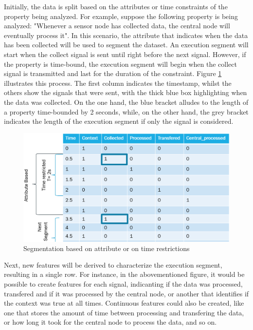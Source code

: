 Initially, the data is split based on the attributes or time constraints of the property being analyzed. For example, suppose the following property is being analyzed: "Whenever a sensor node has collected data, the central node will eventually process it". In this scenario, the attribute that indicates when the data has been collected will be used to segment the dataset. An execution segment will start when the collect signal is sent until right before the next signal. However, if the property is time-bound, the execution segment will begin when the collect signal is transmitted and last for the duration of the constraint. Figure \ref{fig:Segmentation} illustrates this process. The first column indicates the timestamp, whilst the others show the signals that were sent, with the thick blue box highlighting when the data was collected. On the one hand, the blue bracket alludes to the length of a property time-bounded by 2 seconds, while, on the other hand, the grey bracket indicates the length of the execution segment if only the signal is considered.

\begin{figure}[!h]
	\centering
	\includegraphics[width=0.999\textwidth, keepaspectratio]{img/Segmentation2.png}
	\caption{Segmentation based on attribute or on time restrictions}
	\label{fig:Segmentation}
\end{figure}

Next, new features will be derived to characterize the execution segment, resulting in a single row. For instance, in the abovementioned figure, it would be possible to create features for each signal, indicanting if the data was processed, transfered and if it was processed by the central node, or another that identifies if the context was true at all times. Continuous features could also be created, like one that stores the amount of time between processing and transfering the data, or how long it took for the central node to process the data, and so on. 

